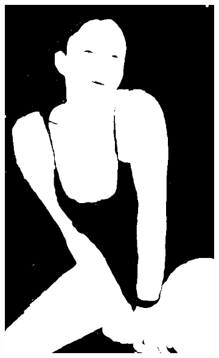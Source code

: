 \begin{figure}[h]
{\begin{subfigure}[b]{0.23\textwidth}
         \includegraphics[width=\textwidth]{images/results/cross_st/linda_rgb_dark_light_y.png}
     \end{subfigure}
    \hfill
     \begin{subfigure}[b]{0.23\textwidth}
         \centering

\end{subfigure}}
\end{figure}
